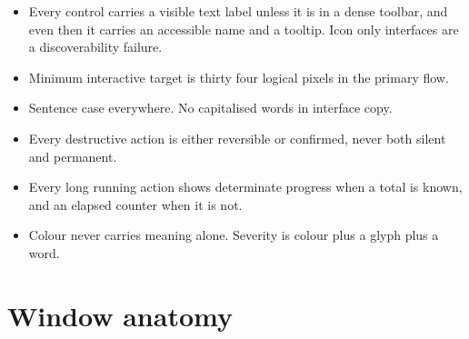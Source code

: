 \begin{itemize}
  \item Every control carries a visible text label unless it is in a dense toolbar, and even
  then it carries an accessible name and a tooltip. Icon only interfaces are a discoverability
  failure.
  \item Minimum interactive target is thirty four logical pixels in the primary flow.
  \item Sentence case everywhere. No capitalised words in interface copy.
  \item Every destructive action is either reversible or confirmed, never both silent and
  permanent.
  \item Every long running action shows determinate progress when a total is known, and an
  elapsed counter when it is not.
  \item Colour never carries meaning alone. Severity is colour plus a glyph plus a word.
\end{itemize}

\section{Window anatomy}


